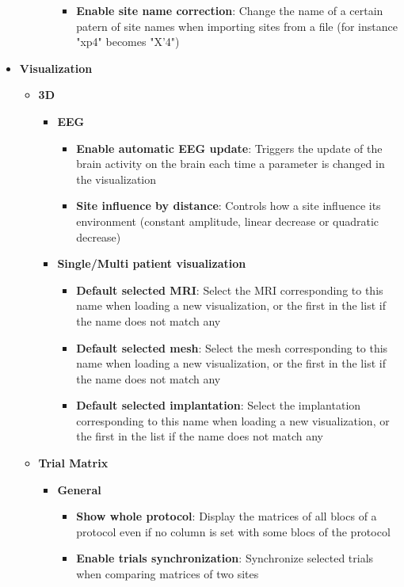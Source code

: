 \documentclass[a4paper]{article}
\begin{document}
\begin{itemize}
\begin{itemize}
\begin{itemize}
\begin{itemize}
\item \textbf{Enable site name correction}: Change the name of a certain patern of site names when importing sites from a file (for instance "xp4" becomes "X'4")
\end{itemize}
\end{itemize}
\end{itemize}
\item \textbf{Visualization}
\begin{itemize}
\item \textbf{3D}
\begin{itemize}
\item \textbf{EEG}
\begin{itemize}
\item \textbf{Enable automatic EEG update}: Triggers the update of the brain activity on the brain each time a parameter is changed in the visualization
\item \textbf{Site influence by distance}: Controls how a site influence its environment (constant amplitude, linear decrease or quadratic decrease)
\end{itemize}
\item \textbf{Single/Multi patient visualization}
\begin{itemize}
\item \textbf{Default selected MRI}: Select the MRI corresponding to this name when loading a new visualization, or the first in the list if the name does not match any
\item \textbf{Default selected mesh}: Select the mesh corresponding to this name when loading a new visualization, or the first in the list if the name does not match any
\item \textbf{Default selected implantation}: Select the implantation corresponding to this name when loading a new visualization, or the first in the list if the name does not match any
\end{itemize}
\end{itemize}
\item \textbf{Trial Matrix}
\begin{itemize}
\item \textbf{General}
\begin{itemize}
\item \textbf{Show whole protocol}: Display the matrices of all blocs of a protocol even if no column is set with some blocs of the protocol
\item \textbf{Enable trials synchronization}: Synchronize selected trials when comparing matrices of two sites

\end{itemize}
\end{itemize}
\end{itemize}
\end{itemize}
\end{document}

